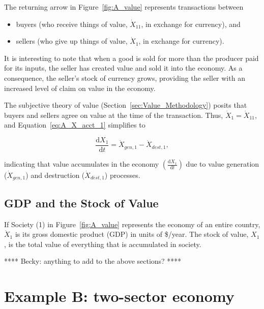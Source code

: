 The returning arrow in Figure~\ref{fig:A_value} 
represents transactions between 
\begin{itemize}
	\item{buyers (who receive things of value, $\dot{X}_{11}$,
	in exchange for currency), and}
	\item{sellers (who give up things of value, $\dot{X}_{1}$,
	in exchange for currency).}
\end{itemize}

It is interesting to note that when a good is sold for more
than the producer paid for its inputs, 
the seller has created value and sold it into the economy. 
As a consequence, the seller's stock of currency grows,
providing the seller with an increased level of claim 
on value in the economy.

The subjective theory of value
(Section~\ref{sec:Value_Methodology})
posits that buyers and sellers agree on value at the 
time of the transaction.
Thus, $\dot{X}_{1} = \dot{X}_{11}$, and Equation~\ref{eq:A_X_acct_1}
simplifies to

\begin{equation} \label{eq:A_X_acct_2}	
	\frac{\mathrm{d}X_{1}}{\mathrm{d}t}	
	= \dot{X}_{gen,1}
	- \dot{X}_{dest,1},
\end{equation}

\noindent{}indicating that value accumulates in the economy
$\left( \frac{\mathrm{d}X_{1}}{\mathrm{d}t} \right)$
due to value generation ($\dot{X}_{gen,1}$) 
and destruction ($\dot{X}_{dest,1}$) processes.


\subsection{GDP and the Stock of Value}

If Society (1) in Figure~\ref{fig:A_value} represents 
the economy of an entire country, 
$\dot{X}_{1}$ is its gross domestic product (GDP)
in units of \$/year.
The stock of value, $X_1$, is the total value of everything that 
is accumulated in society.

**** Becky: anything to add to the above sections? ****


\section{Example B: two-sector economy} %

